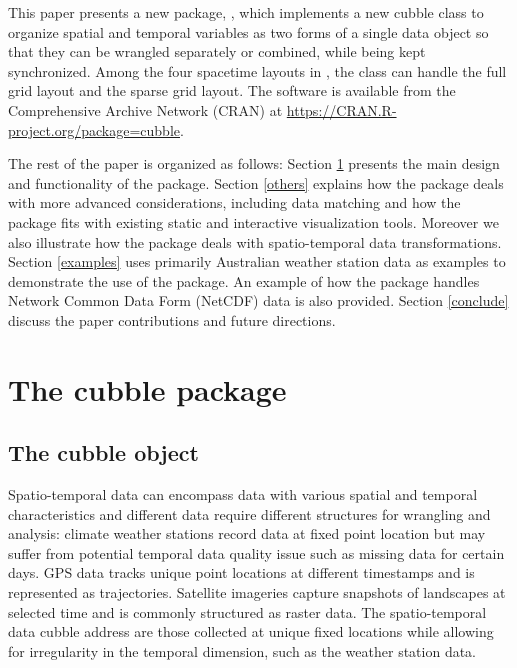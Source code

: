 \documentclass[
  shortnames]{jss}
\begin{document}
This paper presents a new  package, , which implements a new cubble class to organize spatial and temporal variables as two forms of a single data object so that they can be wrangled separately or combined, while being kept synchronized. Among the four spacetime layouts in \citet{spacetime}, the  class can handle the full grid layout and the sparse grid layout. The software is available from the Comprehensive  Archive Network (CRAN) at \url{https://CRAN.R-project.org/package=cubble}.

The rest of the paper is organized as follows: Section \ref{cubble} presents the main design and functionality of the  package. Section \ref{others} explains how the  package deals with more advanced considerations, including data matching and how the package fits with existing static and interactive visualization tools. Moreover we also illustrate how the  package deals with spatio-temporal data transformations. Section \ref{examples} uses primarily Australian weather station data as examples to demonstrate the use of the package. An example of how the  package handles Network Common Data Form (NetCDF) data is also provided. Section \ref{conclude} discuss the paper contributions and future directions.

\hypertarget{cubble}{%
\section{The cubble package}\label{cubble}}

\hypertarget{object}{%
\subsection{The cubble object}\label{object}}

Spatio-temporal data can encompass data with various spatial and temporal characteristics and different data require different structures for wrangling and analysis: climate weather stations record data at fixed point location but may suffer from potential temporal data quality issue such as missing data for certain days. GPS data tracks unique point locations at different timestamps and is represented as trajectories. Satellite imageries capture snapshots of landscapes at selected time and is commonly structured as raster data. The spatio-temporal data cubble address are those collected at unique fixed locations while allowing for irregularity in the temporal dimension, such as the weather station data.
\end{document}
